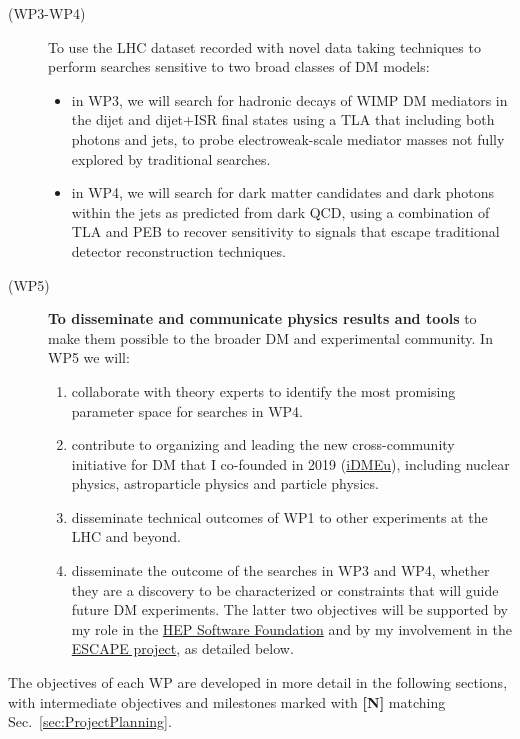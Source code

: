 \begin{description}
\item[(WP3-WP4)] To use the LHC dataset recorded with novel data taking techniques to perform searches sensitive to two broad classes of DM models:
 
\begin{itemize} 
\item in WP3, we will search for hadronic decays of WIMP DM mediators in the dijet and dijet+ISR final states using a TLA that including both photons and jets, to probe electroweak-scale mediator masses not fully explored by traditional searches.
\item in WP4, we will search for dark matter candidates and dark photons within the jets as predicted from dark QCD, using a combination of TLA and PEB to recover sensitivity to signals that escape traditional detector reconstruction techniques.
\end{itemize}

\item[(WP5)] \textbf{To disseminate and communicate physics results and tools} to make them possible to the broader DM and experimental community. In WP5 we will: 

\begin{enumerate} 
\item collaborate with theory experts to identify the most promising parameter space for searches in WP4. 
\item contribute to organizing and leading the new cross-community initiative for DM that I co-founded in 2019 (\href{https://indico.cern.ch/e/iDMEu/}{iDMEu}), including nuclear physics, astroparticle physics and particle physics.
\item disseminate technical outcomes of WP1 to other experiments at the LHC and beyond. 
\item disseminate the outcome of the searches in WP3 and WP4, whether they are a discovery to be characterized or constraints that will guide future DM experiments. The latter two objectives will be supported by my role in the \href{https://hepsoftwarefoundation.org}{HEP Software Foundation} and by my involvement in the \href{https://projectescape.eu}{ESCAPE project}, as detailed below. 
\end{enumerate} 

\end{description}

The objectives of each WP are developed in more detail in the following sections, with intermediate objectives and milestones marked with \textbf{[N]} matching Sec.~\ref{sec:ProjectPlanning}.

